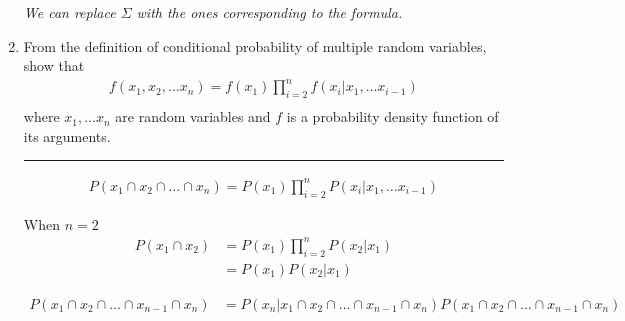 \documentclass[12pt]{article}
\begin{document}
\begin{enumerate}
    \textit{We can replace $\Sigma$ with the ones corresponding to the formula.}
    
    \item From the definition of conditional probability of multiple random variables, show that 
    \begin{align*}
        f(x_1,x_2, \dots x_n) = f(x_1) \prod_{i=2}^{n} f(x_i | x_1, \dots x_{i-1}) \\ 
    \end{align*}
    where $x_1, \dots x_n$ are random variables and $f$ is a probability density function of its arguments. 

    \noindent\rule{\linewidth}{1pt}

    \begin{align*}
        P(x_1 \cap x_2 \cap \dots \cap x_n) = P(x_1) \prod_{i=2}^{n} P(x_i | x_1, \dots x_{i-1}) 
    \end{align*}

    When $n=2$
    \begin{align*}
        P(x_1 \cap x_2) &= P(x_1) \prod_{i=2}^{n} P(x_2 | x_1) \\
                        &= P(x_1) P(x_2 | x_1)
    \end{align*}
        
    \begin{align*}
        P(x_1 \cap x_2 \cap \dots \cap x_{n-1} \cap x_n) &= P(x_n | x_1 \cap x_2 \cap \dots \cap x_{n-1} \cap x_n) P(x_1 \cap x_2 \cap \dots \cap x_{n-1} \cap x_n)
    \end{align*}

\end{enumerate}
\end{document}
